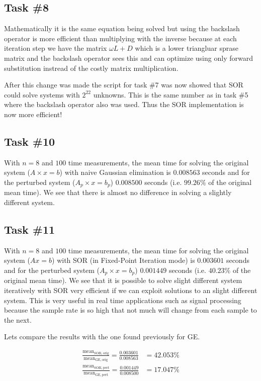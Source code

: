 \documentclass[10pt, a4paper]{article}
\begin{document}
\subsection{Task \#8}
Mathematically it is the same equation being solved but using the backslash operator is more efficient than multiplying with the inverse because at each iteration step we have the matrix $\omega L + D$ which is a lower triangluar sprase matrix and the backslash operator sees this and can optimize using only forward substitution instread of the costly matrix multiplication.

After this change was made the script for task \#7 was now showed that SOR could solve systems with $2^{22}$ unknowns. This is the same number as in task \#5 where the backslash operator also was used. Thus the SOR implementation is now more efficient!

\subsection{Task \#10}
With $n=8$ and $100$ time measurements, the mean time for solving the original system ($A\times x=b$) with naive Gaussian elimination is $0.008563$ seconds  and for the perturbed system ($A_p\times x=b_p$) $0.008500$ seconds (i.e. $99.26\%$ of the original mean time). We see that there is almost no difference in solving a slightly different system.

\subsection{Task \#11} \label{sub+11}
With $n=8$ and $100$ time measurements, the mean time for solving the original system ($Ax=b$) with SOR (in Fixed-Point Iteration mode) is $0.003601$ seconds and for the perturbed system ($A_p\times x=b_p$) $0.001449$ seconds (i.e. $40.23\%$ of the original mean time). We see that it is possible to solve slight different system iteratively with SOR very efficient if we can exploit solutions to an slight different system. This is very useful in real time applications such as signal processing because the sample rate is so high that not much will change from each sample to the next.

Lets compare the results with the one found previously for GE.

\begin{eqnarray}
	\frac{\mathrm{mean}_{\mathrm{SOR, orig}}}{\mathrm{mean}_{\mathrm{GE, orig}}}=\frac{0.003601}{0.008563} & =42.053\% \\
	\frac{\mathrm{mean}_{\mathrm{SOR, pert}}}{\mathrm{mean}_{\mathrm{GE, pert}}}=\frac{0.001449}{0.008500} & =17.047\% \label{math+quota1}
\end{eqnarray}
\end{document}
